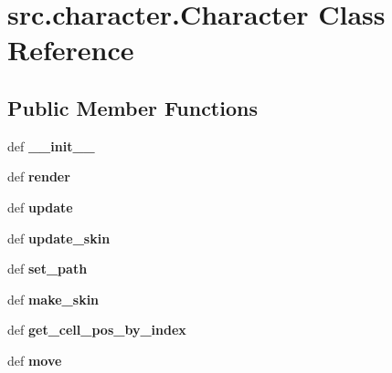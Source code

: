 \hypertarget{classsrc_1_1character_1_1_character}{\section{src.\-character.\-Character \-Class \-Reference}
\label{classsrc_1_1character_1_1_character}
}
\subsection*{\-Public \-Member \-Functions}
\begin{DoxyCompactItemize}
\item 
\hypertarget{classsrc_1_1character_1_1_character_a8d23c8f9bc08acd9f50833b99442d2db}{def {\bfseries \-\_\-\-\_\-init\-\_\-\-\_\-}}\label{classsrc_1_1character_1_1_character_a8d23c8f9bc08acd9f50833b99442d2db}

\item 
\hypertarget{classsrc_1_1character_1_1_character_ab245b38ae250a89596fa64e35ba994de}{def {\bfseries render}}\label{classsrc_1_1character_1_1_character_ab245b38ae250a89596fa64e35ba994de}

\item 
\hypertarget{classsrc_1_1character_1_1_character_a38b28a32b53121efaf406d63b9aeb553}{def {\bfseries update}}\label{classsrc_1_1character_1_1_character_a38b28a32b53121efaf406d63b9aeb553}

\item 
\hypertarget{classsrc_1_1character_1_1_character_a08f530ce06eaa3e98893e6187f0d55ff}{def {\bfseries update\-\_\-skin}}\label{classsrc_1_1character_1_1_character_a08f530ce06eaa3e98893e6187f0d55ff}

\item 
\hypertarget{classsrc_1_1character_1_1_character_a3adec53ea20268070e68f86e1e1ad16d}{def {\bfseries set\-\_\-path}}\label{classsrc_1_1character_1_1_character_a3adec53ea20268070e68f86e1e1ad16d}

\item 
\hypertarget{classsrc_1_1character_1_1_character_aeb893b6369a22260495c4f6c9e7d9456}{def {\bfseries make\-\_\-skin}}\label{classsrc_1_1character_1_1_character_aeb893b6369a22260495c4f6c9e7d9456}

\item 
\hypertarget{classsrc_1_1character_1_1_character_aef87974d3f913d87c34d8eefcf0dd584}{def {\bfseries get\-\_\-cell\-\_\-pos\-\_\-by\-\_\-index}}\label{classsrc_1_1character_1_1_character_aef87974d3f913d87c34d8eefcf0dd584}

\item 
\hypertarget{classsrc_1_1character_1_1_character_a6bdbe8c4ea3b6c68b6a79944ae0a7648}{def {\bfseries move}}\label{classsrc_1_1character_1_1_character_a6bdbe8c4ea3b6c68b6a79944ae0a7648}

\end{DoxyCompactItemize}
